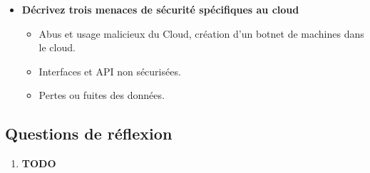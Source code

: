 \documentclass{report}
\begin{document}
\begin{itemize}
				\item \textbf{Décrivez trois menaces de sécurité spécifiques au cloud}

					\begin{itemize}
						\item Abus et usage malicieux du Cloud, création d'un botnet de machines dans le cloud.
						\item Interfaces et API non sécurisées.
						\item Pertes ou fuites des données.\\
					\end{itemize}
			\end{itemize}
			

		\subsection{Questions de réflexion}

			\begin{enumerate}
				\item \textbf{TODO}
			\end{enumerate}
\end{document}
